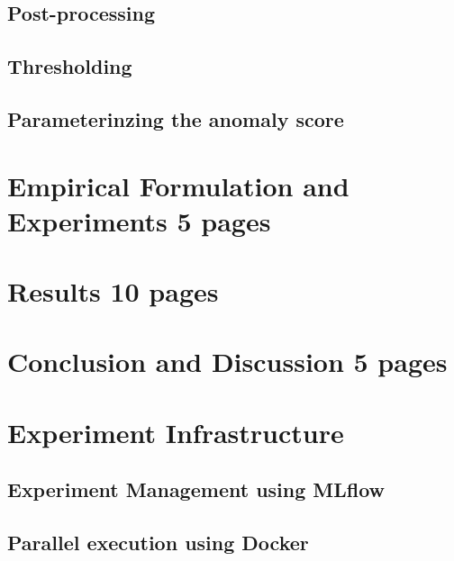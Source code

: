 \documentclass[12pt]{article}
\begin{document}
\subsection{Post-processing}
\subsection{Thresholding}
\subsection{Parameterinzing the anomaly score}
\newpage 
\section{Empirical Formulation and Experiments 5 pages}
\newpage
\section{Results 10 pages}
\newpage
\section{Conclusion and Discussion 5 pages}
\newpage
\section{Experiment Infrastructure}
\newpage
\subsection{Experiment Management using MLflow}
\newpage
\subsection{Parallel execution using Docker}
\newpage
\end{document}
